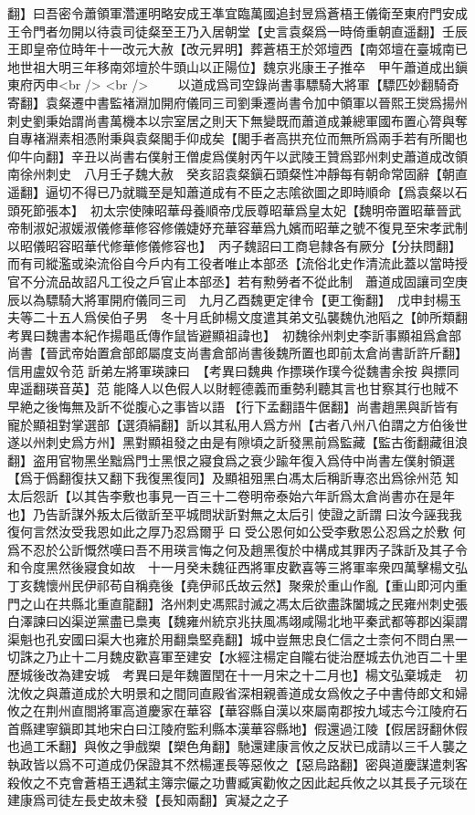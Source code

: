 翻】曰吾密令蕭領軍濳運明略安成王凖宜臨萬國追封昱爲蒼梧王儀衛至東府門安成王令門者勿開以待袁司徒粲至王乃入居朝堂【史言袁粲爲一時倚重朝直遥翻】壬辰王即皇帝位時年十一改元大赦【改元昇明】葬蒼梧王於郊壇西【南郊壇在臺城南已地世祖大明三年移南郊壇於牛頭山以正陽位】魏京兆康王子推卒　甲午蕭道成出鎭東府丙申<br />
<br />
　　以道成爲司空錄尚書事驃騎大將軍【驃匹妙翻騎奇寄翻】袁粲遷中書監褚淵加開府儀同三司劉秉遷尚書令加中領軍以晉熙王爕爲揚州刺史劉秉始謂尚書萬機本以宗室居之則天下無變既而蕭道成兼總軍國布置心膂與奪自專褚淵素相憑附秉與袁粲閣手仰成矣【閣手者高拱充位而無所爲兩手若有所閣也仰牛向翻】辛丑以尚書右僕射王僧䖍爲僕射丙午以武陵王贊爲郢州刺史蕭道成改領南徐州刺史　八月壬子魏大赦　癸亥詔袁粲鎭石頭粲性冲靜每有朝命常固辭【朝直遥翻】逼切不得已乃就職至是知蕭道成有不臣之志隂欲圖之即時順命【爲袁粲以石頭死節張本】　初太宗使陳昭華母養順帝戊辰尊昭華爲皇太妃【魏明帝置昭華晉武帝制淑妃淑媛淑儀修華修容修儀婕妤充華容華爲九嬪而昭華之號不復見至宋孝武制以昭儀昭容昭華代修華修儀修容也】　丙子魏詔曰工商皂隸各有厥分【分扶問翻】而有司縱濫或染流俗自今戶内有工役者唯止本部丞【流俗北史作清流此蓋以當時授官不分流品故詔凡工役之戶官止本部丞】若有勲勞者不從此制　蕭道成固讓司空庚辰以為驃騎大將軍開府儀同三司　九月乙酉魏更定律令【更工衡翻】　戊申封楊玉夫等二十五人爲侯伯子男　冬十月氐帥楊文度遣其弟文弘襲魏仇池䧟之【帥所類翻　考異曰魏書本紀作揚黽氐傳作鼠皆避顯祖諱也】　初魏徐州刺史李訢事顯祖爲倉部尚書【晉武帝始置倉部郎屬度支尚書倉部尚書後魏所置也即前太倉尚書訢許斤翻】信用盧奴令范訢弟左將軍瑛諫曰　【考異曰魏典作摽瑛作璞今從魏書余按與摽同卑遥翻瑛音英】范能降人以色假人以財輕德義而重勢利聽其言也甘察其行也賊不早絶之後悔無及訢不從腹心之事皆以語【行下孟翻語牛倨翻】尚書趙黑與訢皆有寵於顯祖對掌選部【選須絹翻】訢以其私用人爲方州【古者八州八伯謂之方伯後世遂以州刺史爲方州】黑對顯祖發之由是有隙頃之訢發黑前爲監藏【監古銜翻藏徂浪翻】盗用官物黑坐黜爲門士黑恨之寢食爲之衰少踰年復入爲侍中尚書左僕射領選【爲于僞翻復扶又翻下我復黑復同】及顯祖殂黑白馮太后稱訢專恣出爲徐州范知太后怨訢【以其告李敷也事見一百三十二卷明帝泰始六年訢爲太倉尚書亦在是年也】乃告訢謀外叛太后徵訢至平城問狀訢對無之太后引使證之訢謂曰汝今誣我我復何言然汝受我恩如此之厚乃忍爲爾乎曰受公恩何如公受李敷恩公忍爲之於敷何爲不忍於公訢慨然嘆曰吾不用瑛言悔之何及趙黑復於中構成其罪丙子誅訢及其子令和令度黑然後寢食如故　十一月癸未魏征西將軍皮歡喜等三將軍率衆四萬擊楊文弘　丁亥魏懷州民伊祁苟自稱堯後【堯伊祁氏故云然】聚衆於重山作亂【重山即河内重門之山在共縣北重直龍翻】洛州刺史馮熙討滅之馮太后欲盡誅闔城之民雍州刺史張白澤諫曰凶渠逆黨盡已梟夷【魏雍州統京兆扶風馮翊咸陽北地平秦武都等郡凶渠謂渠魁也孔安國曰渠大也雍於用翻梟堅堯翻】城中豈無忠良仁信之士柰何不問白黑一切誅之乃止十二月魏皮歡喜軍至建安【水經注楊定自隴右徙治歷城去仇池百二十里歷城後改為建安城　考異曰是年魏置閏在十一月宋之十二月也】楊文弘棄城走　初沈攸之與蕭道成於大明景和之間同直殿省深相親善道成女爲攸之子中書侍郎文和婦攸之在荆州直閤將軍高道慶家在華容【華容縣自漢以來屬南郡按九域志今江陵府石首縣建寧鎭即其地宋白曰江陵府監利縣本漢華容縣地】假還過江陵【假居訝翻休假也過工禾翻】與攸之爭戲槊【槊色角翻】馳還建康言攸之反狀已成請以三千人襲之執政皆以爲不可道成仍保證其不然楊運長等惡攸之【惡烏路翻】密與道慶謀遣刺客殺攸之不克會蒼梧王遇弑主簿宗儼之功曹臧寅勸攸之因此起兵攸之以其長子元琰在建康爲司徒左長史故未發【長知兩翻】寅凝之之子